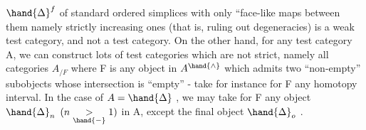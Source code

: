 $\hand{\Delta}^{f}$ of standard ordered simplices with only ``face-like maps between them\hand{,}
namely strictly increasing ones (that is, ruling out degeneracies) is
a weak test category, and not a test category. On the other hand, for
any test category A, we can construct lots of test categories which are
not strict, namely all categories $A_{/F}$ where F is any  object in $A^{\hand{\wedge}}$ which
admits two ``non-empty'' subobjects whose intersection is ``empty'' - take
for instance for F any homotopy interval. In the case of $A = \hand{\Delta}$ , we may
take for F any object $\hand{\Delta}_{n}$ $(n \mathrel{\underset{\hand{-}}{>}} 1)$ in A, except  the final object $\hand{\Delta}_{o}$ .



